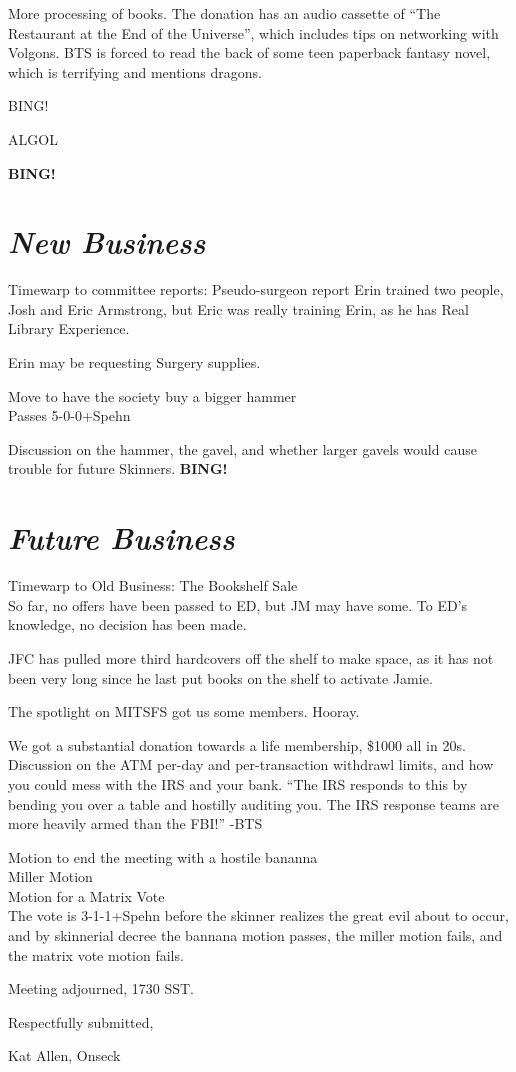 \documentclass[10pt]{article}
\newcommand{\bing}{{\bf BING!} }
\newcommand{\goto}[1]{\bing \vskip 12pt \section*{{\em{#1}}}}
\begin{document}
More processing of books.  The donation has an audio cassette of ``The
Restaurant at the End of the Universe'', which includes tips on
networking with Volgons.  BTS is forced to read the back of some teen
paperback fantasy novel, which is terrifying and mentions dragons.

BING!

ALGOL 

\goto{New Business} 

Timewarp to committee reports:
Pseudo-surgeon report Erin trained two people, Josh and Eric
Armstrong, but Eric was really training Erin, as he has Real Library
Experience.

Erin may be requesting Surgery supplies.

Move to have the society buy a bigger hammer\\
Passes 5-0-0+Spehn

Discussion on the hammer, the gavel, and whether larger gavels would
cause trouble for future Skinners.
\goto{Future Business}

Timewarp to Old Business: The Bookshelf Sale\\
So far, no offers have been passed to ED,
but JM may have some.  To ED's knowledge, no decision has been made.

JFC has pulled more third hardcovers off the shelf to make space, as
it has not been very long since he last put books on the shelf to
activate Jamie.

The spotlight on MITSFS got us some members. Hooray.

We got a substantial donation towards a life membership, \$1000 all in
20s. Discussion on the ATM per-day and per-transaction withdrawl
limits, and how you could mess with the IRS and your bank.  ``The IRS
responds to this by bending you over a table and hostilly auditing
you.  The IRS response teams are more heavily armed than the FBI!'' -BTS

Motion to end the meeting with a hostile bananna\\
Miller Motion \\
Motion for a Matrix Vote\\

The vote is  3-1-1+Spehn  before the skinner realizes the great evil about to occur, and by skinnerial
decree the bannana motion passes, the miller motion fails, and the
matrix vote motion fails.



\vspace{12pt}

\noindent
Meeting adjourned, 1730 SST.

\vspace{18pt}

\centerline{Respectfully submitted,}
\centerline{Kat Allen,  Onseck}
\end{document}
